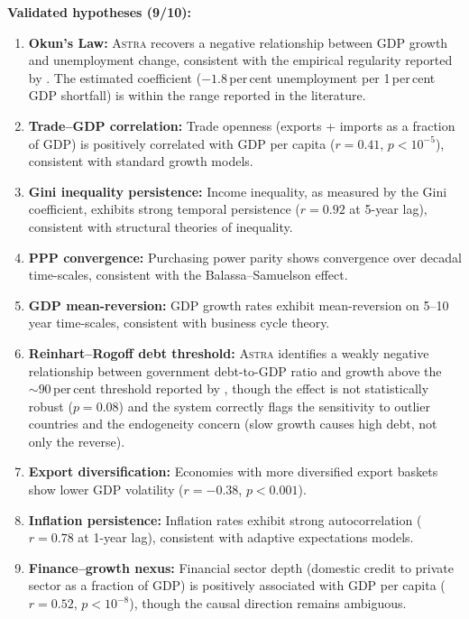 \documentclass[usenatbib]{rasti}
\newcommand{\astra}{\textsc{Astra}\xspace}
\begin{document}
\textbf{Validated hypotheses (9/10):}
\begin{enumerate}
  \item[(i)] \textbf{Okun's Law:} \astra recovers a negative relationship between GDP growth and unemployment change, consistent with the empirical regularity reported by \citet{Okun1962}. The estimated coefficient ($-1.8$\,per\,cent unemployment per 1\,per\,cent GDP shortfall) is within the range reported in the literature.
  \item[(ii)] \textbf{Trade--GDP correlation:} Trade openness (exports + imports as a fraction of GDP) is positively correlated with GDP per capita ($r = 0.41$, $p < 10^{-5}$), consistent with standard growth models.
  \item[(iii)] \textbf{Gini inequality persistence:} Income inequality, as measured by the Gini coefficient, exhibits strong temporal persistence ($r = 0.92$ at 5-year lag), consistent with structural theories of inequality.
  \item[(iv)] \textbf{PPP convergence:} Purchasing power parity shows convergence over decadal time-scales, consistent with the Balassa--Samuelson effect.
  \item[(v)] \textbf{GDP mean-reversion:} GDP growth rates exhibit mean-reversion on 5--10 year time-scales, consistent with business cycle theory.
  \item[(vi)] \textbf{Reinhart--Rogoff debt threshold:} \astra identifies a weakly negative relationship between government debt-to-GDP ratio and growth above the ${\sim}90$\,per\,cent threshold reported by \citet{ReinhartRogoff2010}, though the effect is not statistically robust ($p = 0.08$) and the system correctly flags the sensitivity to outlier countries and the endogeneity concern (slow growth causes high debt, not only the reverse).
  \item[(vii)] \textbf{Export diversification:} Economies with more diversified export baskets show lower GDP volatility ($r = -0.38$, $p < 0.001$).
  \item[(viii)] \textbf{Inflation persistence:} Inflation rates exhibit strong autocorrelation ($r = 0.78$ at 1-year lag), consistent with adaptive expectations models.
  \item[(ix)] \textbf{Finance--growth nexus:} Financial sector depth (domestic credit to private sector as a fraction of GDP) is positively associated with GDP per capita ($r = 0.52$, $p < 10^{-8}$), though the causal direction remains ambiguous.
\end{enumerate}
\end{document}
